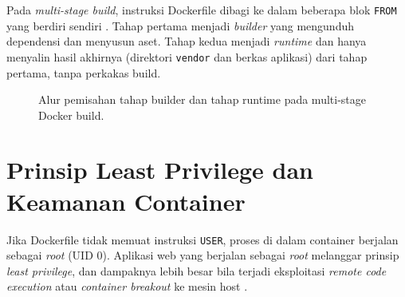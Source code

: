 \documentclass[a4paper,oneside,12pt]{report}
\begin{document}
Pada \textit{multi-stage build}, instruksi Dockerfile dibagi ke dalam beberapa blok \texttt{FROM} yang berdiri sendiri \cite{docker-multistage}. Tahap pertama menjadi \textit{builder} yang mengunduh dependensi dan menyusun aset. Tahap kedua menjadi \textit{runtime} dan hanya menyalin hasil akhirnya (direktori \texttt{vendor} dan berkas aplikasi) dari tahap pertama, tanpa perkakas build.

\begin{figure}[H]
    \centering
    \caption{Alur pemisahan tahap builder dan tahap runtime pada multi-stage Docker build.}
    \label{fig:multistage}
\end{figure}

\section{Prinsip Least Privilege dan Keamanan Container}
Jika Dockerfile tidak memuat instruksi \texttt{USER}, proses di dalam container berjalan sebagai \textit{root} (UID 0). Aplikasi web yang berjalan sebagai \textit{root} melanggar prinsip \textit{least privilege}, dan dampaknya lebih besar bila terjadi eksploitasi \textit{remote code execution} atau \textit{container breakout} ke mesin host \cite{docker-security}.
\end{document}
